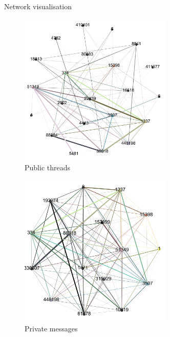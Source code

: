 \documentclass[hyperref={pdfpagelabels=false}]{beamer}
\begin{document}
\begin{frame}[fragile]
\begin{columns}[t]
\begin{column}{.45\textwidth}
\begin{block}{Network visualisation}
  \begin{figure}[!ht]
  	\includegraphics[width=0.65\textwidth]{figures/public_threads_network.png}
  	\caption{Public threads}
  	\label{fig:public_threads_visualisation}
  \end{figure}

  \begin{figure}[!ht]
  	\includegraphics[width=0.65\textwidth]{figures/private_messages_network.png}
  	\caption{Private messages}
  	\label{fig:private_messages_visualisation}
  \end{figure}
\end{block}


\end{column}
\end{columns}
\end{frame}
\end{document}
